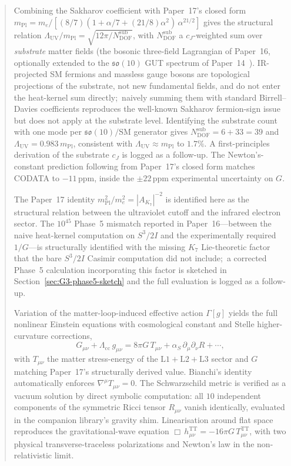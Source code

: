 \documentclass[11pt]{article}
\newcommand{\so}{\mathfrak{so}}
\newcommand{\mPl}{m_{\mathrm{Pl}}}
\newcommand{\me}{m_e}
\begin{document}
\begin{abstract}
Combining the Sakharov coefficient with Paper~17's closed form
$\mPl = \me / [(8/7)(1 + \alpha/7 + (21/8)\alpha^2)\,\alpha^{21/2}]$
gives the structural relation
$\Lambda_{\mathrm{UV}}/\mPl =
\sqrt{12\pi/N_{\mathrm{DOF}}^{\mathrm{sub}}}$, with
$N_{\mathrm{DOF}}^{\mathrm{sub}}$ a $c_J$-weighted sum over
\emph{substrate} matter fields (the bosonic three-field Lagrangian
of Paper~16, optionally extended to the $\so(10)$ GUT spectrum of
Paper~14~\cite{paper14}).  IR-projected SM fermions and massless
gauge bosons are topological projections of the substrate, not new
fundamental fields, and do not enter the heat-kernel sum directly;\
naively summing them with standard Birrell--Davies coefficients
reproduces the well-known Sakharov fermion-sign issue but does
not apply at the substrate level.  Identifying the substrate count
with one mode per $\so(10)/\mathrm{SM}$ generator gives
$N_{\mathrm{DOF}}^{\mathrm{sub}} = 6 + 33 = 39$ and
$\Lambda_{\mathrm{UV}} = 0.983\,\mPl$, consistent with
$\Lambda_{\mathrm{UV}} \approx \mPl$ to $1.7\%$.  A
first-principles derivation of the substrate $c_J$ is logged as a
follow-up.  The Newton's-constant prediction following from
Paper~17's closed form matches CODATA to $-11$\,ppm, inside the
$\pm 22$\,ppm experimental uncertainty on $G$.

The Paper~17 identity $\mPl^2/\me^2 = |A_{K_7}|^{-2}$ is identified
here as the structural relation between the ultraviolet cutoff and
the infrared electron sector.  The $10^{45}$ Phase~5 mismatch
reported in Paper~16---between the naive heat-kernel computation on
$S^3/2I$ and the experimentally required $1/G$---is structurally
identified with the missing $K_7$ Lie-theoretic factor that the
bare $S^3/2I$ Casimir computation did not include;\ a corrected
Phase~5 calculation incorporating this factor is sketched in
Section~\ref{sec:G3-phase5-sketch} and the full evaluation is
logged as a follow-up.

Variation of the matter-loop-induced effective action $\Gamma[g]$
yields the full nonlinear Einstein equations with cosmological
constant and Stelle higher-curvature corrections,
\begin{equation*}
  G_{\mu\nu} + \Lambda_{\mathrm{cc}}\,g_{\mu\nu}
  = 8\pi G\,T_{\mu\nu}
  + \alpha_S\,\partial_\mu\partial_\nu R + \cdots,
\end{equation*}
with $T_{\mu\nu}$ the matter stress-energy of the
$\mathrm{L}1{+}\mathrm{L}2{+}\mathrm{L}3$ sector and $G$ matching
Paper~17's structurally derived value.  Bianchi's identity
automatically enforces $\nabla^\mu T_{\mu\nu} = 0$.  The
Schwarzschild metric is verified as a vacuum solution by direct
symbolic computation: all $10$ independent components of the
symmetric Ricci tensor $R_{\mu\nu}$ vanish identically, evaluated
in the companion library's gravity shim.
Linearisation around flat space reproduces the gravitational-wave
equation $\Box\,h^{\mathrm{TT}}_{\mu\nu} = -16\pi G\,T^{\mathrm{TT}}_{\mu\nu}$,
with two physical transverse-traceless polarizations and Newton's
law in the non-relativistic limit.


\end{abstract}
\end{document}
